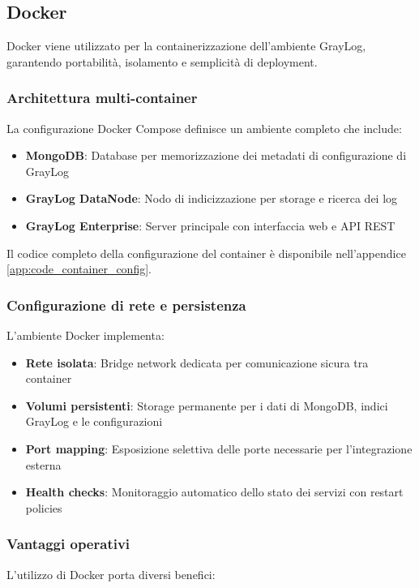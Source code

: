 \documentclass[12pt]{report}
\begin{document}
\subsection{Docker}
\label{subsec:docker}

Docker viene utilizzato per la containerizzazione dell'ambiente GrayLog, garantendo portabilità, isolamento e semplicità di deployment.

\subsubsection{Architettura multi-container}
La configurazione Docker Compose definisce un ambiente completo che include:

\begin{itemize}
    \item \textbf{MongoDB}: Database per memorizzazione dei metadati di configurazione di GrayLog
    \item \textbf{GrayLog DataNode}: Nodo di indicizzazione per storage e ricerca dei log
    \item \textbf{GrayLog Enterprise}: Server principale con interfaccia web e API REST
\end{itemize}

Il codice completo della configurazione del container è disponibile nell'appendice \ref{app:code_container_config}.

\subsubsection{Configurazione di rete e persistenza}
L'ambiente Docker implementa:

\begin{itemize}
    \item \textbf{Rete isolata}: Bridge network dedicata per comunicazione sicura tra container
    \item \textbf{Volumi persistenti}: Storage permanente per i dati di MongoDB, indici GrayLog e le configurazioni
    \item \textbf{Port mapping}: Esposizione selettiva delle porte necessarie per l'integrazione esterna
    \item \textbf{Health checks}: Monitoraggio automatico dello stato dei servizi con restart policies
\end{itemize}

\subsubsection{Vantaggi operativi}
L'utilizzo di Docker porta diversi benefici:
\end{document}
